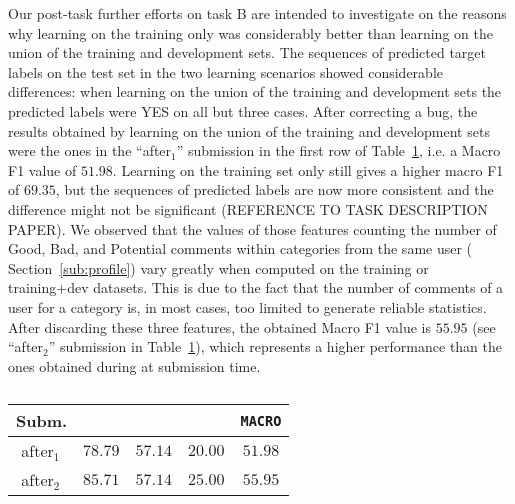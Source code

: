Our post-task further efforts on task B are intended to investigate on the 
reasons why learning on the training only was considerably better than learning 
on the union of the training and development sets. 
The sequences of predicted target labels on the test set in the two learning 
scenarios showed considerable differences: when learning on the union of the 
training and development sets the predicted labels were YES on all but three 
cases. 
After correcting a bug, the results obtained by learning on the union of the 
training and development sets were the ones in the ``after$_1$'' submission in 
the first row of Table~\ref{tab:aftertaskb}, i.e.  
a Macro F1 value of $51.98$. Learning on the training set only still gives a 
higher macro F1 of $69.35$, but the sequences of predicted labels are now more 
consistent and the difference might not be significant (REFERENCE TO TASK 
DESCRIPTION PAPER). 
We observed that the values of those features counting the number of Good, Bad, 
and Potential comments within categories from the same user (\cf 
Section~\ref{sub:profile}) vary greatly when computed on the training or 
training+dev datasets. 
This is due to the fact that the number of comments of a user for a category is, 
in most cases, too limited to generate reliable statistics. 
After discarding these three features, the obtained Macro F1 value is $55.95$ 
(see ``after$_2$'' submission in Table~\ref{tab:aftertaskb}), which represents a 
higher performance than the ones obtained during at submission time.

\begin{table}%
\begin{tabular}{|l|cccc|}
\hline  
 Subm.		& \bf \yes & \bf \no & \bf \unsure & \bf \texttt{MACRO}	 \\
  \hline
  \,\,after$_1$	& $78.79$	& $57.14$	& $20.00$	& $51.98$ \\
  \,\,after$_2$ & $85.71$	& $57.14$	& $25.00$ 	& $55.95$ \\
  \hline
 \end{tabular}
 \caption{\label{tab:aftertaskb}}
 \end{table}